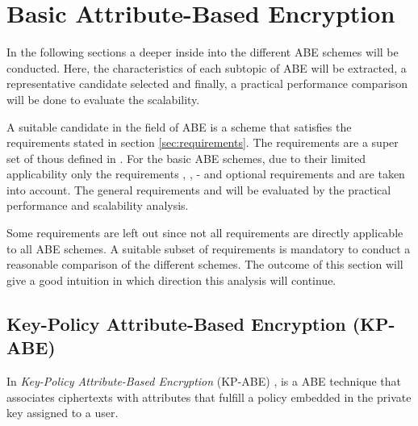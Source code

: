 \section{Basic Attribute-Based Encryption}
In the following sections a deeper inside into the different ABE schemes will be conducted. Here, the characteristics of each subtopic of ABE  will be extracted, a representative candidate selected and finally, a practical performance comparison will be done to evaluate the scalability. 

A suitable candidate in the field of ABE is a scheme that satisfies the requirements stated in section \ref{sec:requirements}. The requirements are a super set of thous defined in \cite{lee2013survey}. For the basic \ac{ABE} schemes, due to their limited applicability only the requirements , ,  -  and optional requirements  and  are taken into account.
The general requirements  and  will be evaluated by the practical performance and scalability analysis. 

Some requirements are left out since not all requirements are directly applicable to all ABE schemes. A suitable subset of requirements is mandatory to conduct a reasonable comparison of the different schemes. The outcome of this section will give a good intuition in which direction this analysis will continue. 



\subsection{Key-Policy Attribute-Based Encryption (\ac{KP-ABE})}
In \textit{Key-Policy Attribute-Based Encryption} (\ac{KP-ABE}) \cite{goyal2006attribute}, is a \ac{ABE} technique that associates ciphertexts with attributes that fulfill a policy embedded in the private key assigned to a user. 

